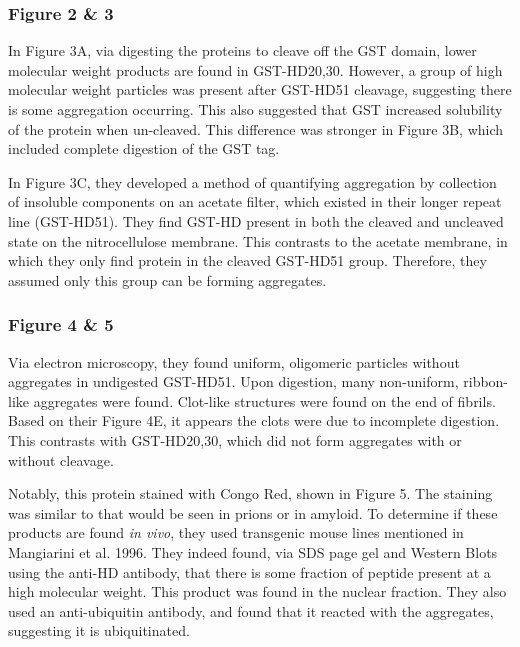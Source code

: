\documentclass[12pt]{report}
\begin{document}
\subsubsection{Figure 2 \& 3}

In Figure 3A, via digesting the proteins to cleave off the GST domain, lower molecular weight products are found in GST-HD20,30. However, a group of high molecular weight particles was present after GST-HD51 cleavage, suggesting there is some aggregation occurring. This also suggested that GST increased solubility of the protein when un-cleaved. This difference was stronger in Figure 3B, which included complete digestion of the GST tag.\newline

In Figure 3C, they developed a method of quantifying aggregation by collection of insoluble components on an acetate filter, which existed in their longer repeat line (GST-HD51). They find GST-HD present in both the cleaved and uncleaved state on the nitrocellulose membrane. This contrasts to the acetate membrane, in which they only find protein in the cleaved GST-HD51 group. Therefore, they assumed only this group can be forming aggregates.

\subsubsection{Figure 4 \& 5}

Via electron microscopy, they found uniform, oligomeric particles without aggregates in undigested GST-HD51. Upon digestion, many non-uniform, ribbon-like aggregates were found. Clot-like structures were found on the end of fibrils. Based on their Figure 4E, it appears the clots were due to incomplete digestion. This contrasts with GST-HD20,30, which did not form aggregates with or without cleavage.\newline

Notably, this protein stained with Congo Red, shown in Figure 5. The staining was similar to that would be seen in prions or in amyloid. To determine if these products are found \textit{in vivo}, they used transgenic mouse lines mentioned in Mangiarini et al. 1996. They indeed found, via SDS page gel and Western Blots using the anti-HD antibody, that there is some fraction of peptide present at a high molecular weight. This product was found in the nuclear fraction. They also used an anti-ubiquitin antibody, and found that it reacted with the aggregates, suggesting it is ubiquitinated.\newline
\end{document}
